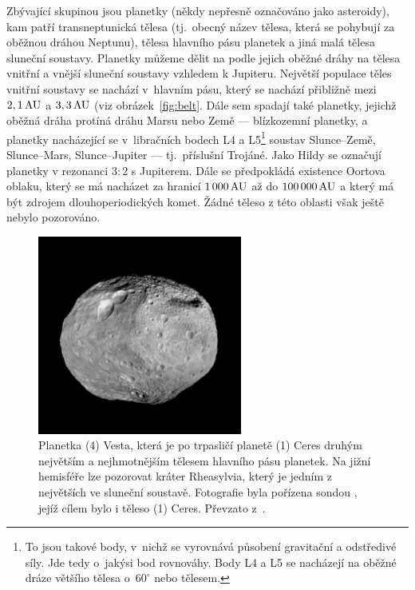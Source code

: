 \documentclass[A4paper, 12pt, oneside]{book}
\begin{document}
Zbývající skupinou jsou planetky (někdy nepřesně označováno jako asteroidy), kam patří transneptunická tělesa (tj.\ obecný název tělesa, která se pohybují za oběžnou dráhou Neptunu), tělesa hlavního pásu planetek a jiná malá tělesa sluneční soustavy. Planetky můžeme dělit na podle jejich oběžné dráhy na tělesa vnitřní a vnější sluneční soustavy vzhledem k Jupiteru. Největší populace těles vnitřní soustavy se nachází v~hlavním pásu, který se nachází přibližně mezi $2,1\, {\rm AU}$ a $3,3\, {\rm AU}$ (viz obrázek~\ref{fig:belt}. Dále sem spadají také planetky, jejichž oběžná dráha protíná dráhu Marsu nebo Země --- blízkozemní planetky, a planetky nacházející se v~libračních bodech L4 a L5\footnote{To jsou takové body, v~nichž se vyrovnává působení gravitační a odstředivé síly. Jde tedy o~jakýsi bod rovnováhy. Body L4 a L5 se nacházejí na oběžné dráze většího tělesa o~$60^\circ$  nebo  tělesem.} soustav Slunce--Země, Slunce--Mars, Slunce--Jupiter --- tj.\ příslušní Trojáné. Jako Hildy se označují planetky v rezonanci $3:2$ s Jupiterem. Dále se předpokládá existence Oortova oblaku, který se má nacházet za hranicí $1\,000\,{\rm AU}$ až do $100\,000\,{\rm AU}$ a který má být zdrojem dlouhoperiodických komet. Žádné těleso z této oblasti však ještě nebylo pozorováno.

\begin{figure}
	\centering
	\includegraphics[width=0.6\textwidth]{obr/vesta.jpg}
	\caption{Planetka (4) Vesta, která je po trpasličí planetě (1) Ceres druhým největším a nejhmotnějším tělesem hlavního pásu planetek. Na jižní hemisféře lze pozorovat kráter Rheasylvia, který je jedním z největších ve sluneční soustavě. Fotografie byla pořízena sondou , jejíž cílem bylo i těleso (1) Ceres. Převzato z~\cite{jplvesta}.}
\end{figure}
\end{document}
